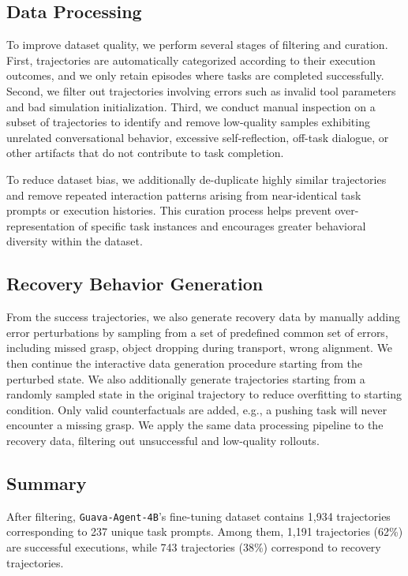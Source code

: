 \subsection{Data Processing}
To improve dataset quality, we perform several stages of filtering and curation. First, trajectories are automatically categorized according to their execution outcomes, and we only retain episodes where tasks are completed successfully. Second, we filter out trajectories involving errors such as invalid tool parameters and bad simulation initialization. Third, we conduct manual inspection on a subset of trajectories to identify and remove low-quality samples exhibiting unrelated conversational behavior, excessive self-reflection, off-task dialogue, or other artifacts that do not contribute to task completion.

To reduce dataset bias, we additionally de-duplicate highly similar trajectories and remove repeated interaction patterns arising from near-identical task prompts or execution histories. This curation process helps prevent over-representation of specific task instances and encourages greater behavioral diversity within the dataset.

\subsection{Recovery Behavior Generation}

From the success trajectories, we also generate recovery data by manually adding error perturbations by sampling from a set of predefined common set of errors, including missed grasp, object dropping during transport, wrong alignment. We then continue the interactive data generation procedure starting from the perturbed state. We also additionally generate trajectories starting from a randomly sampled state in the original trajectory to reduce overfitting to starting condition. Only valid counterfactuals are added, e.g., a pushing task will never encounter a missing grasp. We apply the same data processing pipeline to the recovery data, filtering out unsuccessful and low-quality rollouts. 

\subsection{Summary}
After filtering, \texttt{Guava-Agent-4B}'s fine-tuning dataset contains 1,934 trajectories corresponding to 237 unique task prompts. Among them, 1,191 trajectories (62\%) are successful executions, while 743 trajectories (38\%) correspond to recovery trajectories. 


